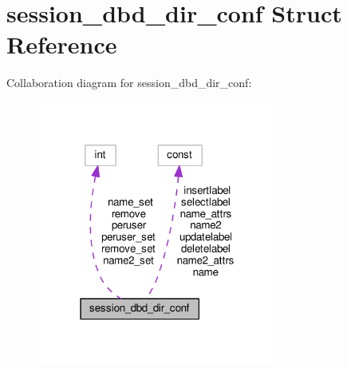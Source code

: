 \hypertarget{structsession__dbd__dir__conf}{}\section{session\+\_\+dbd\+\_\+dir\+\_\+conf Struct Reference}
\label{structsession__dbd__dir__conf}


Collaboration diagram for session\+\_\+dbd\+\_\+dir\+\_\+conf\+:
\nopagebreak
\begin{figure}[H]
\begin{center}
\leavevmode
\includegraphics[width=226pt]{structsession__dbd__dir__conf__coll__graph}
\end{center}
\end{figure}
